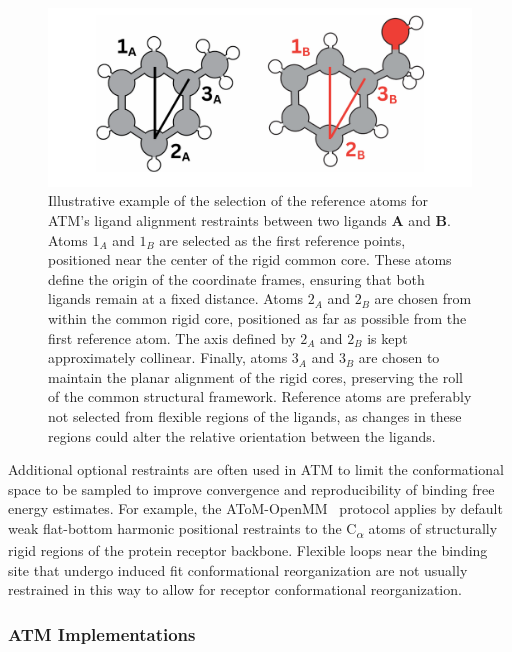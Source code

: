 \documentclass[9pt,bestpractices]{livecoms}
\begin{document}
\begin{figure}[h!]
    \centering
    \includegraphics[width=0.95\linewidth]{paper/figures_atm/atm_lig_alignment.pdf}
    \caption{Illustrative example of the selection of the reference atoms for ATM's ligand alignment restraints between two ligands \textbf{A} and \textbf{B}. Atoms \textbf{$1_A$} and \textbf{$1_B$} are selected as the first reference points, positioned near the center of the rigid common core. These atoms define the origin of the coordinate frames, ensuring that both ligands remain at a fixed distance. Atoms \textbf{$2_A$} and \textbf{$2_B$} are chosen from within the common rigid core, positioned as far as possible from the first reference atom. The axis defined by $2_A$ and $2_B$ is kept approximately collinear. Finally, atoms \textbf{$3_A$} and \textbf{$3_B$} are chosen to maintain the planar alignment of the rigid cores, preserving the roll of the common structural framework. Reference atoms are preferably not selected from flexible regions of the ligands, as changes in these regions could alter the relative orientation between the ligands.
    }
    \label{fig:atm_lig_alignment}
\end{figure}

Additional optional restraints are often used in ATM to limit the conformational space to be sampled to improve convergence and reproducibility of binding free energy estimates. For example, the AToM-OpenMM~\cite{atom-openmm-github2025} protocol applies by default weak flat-bottom harmonic positional restraints to the C\textsubscript{$\alpha$} atoms of structurally rigid regions of the protein receptor backbone. Flexible loops near the binding site that undergo induced fit conformational reorganization are not usually restrained in this way to allow for receptor conformational reorganization.


\subsubsection{ATM Implementations} 
\end{document}
